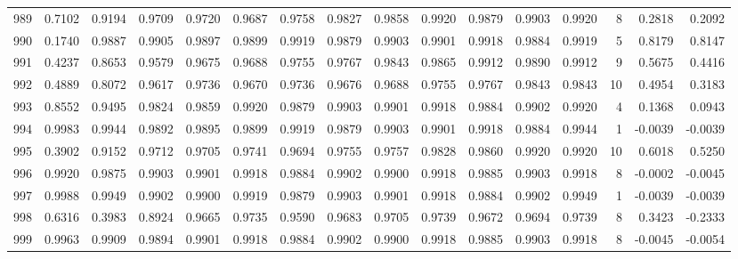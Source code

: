 \begin{tabular}{lrrrrrrrrrrrrrrr}
989 &      0.7102 &  0.9194 &  0.9709 &  0.9720 &  0.9687 &  0.9758 &  0.9827 &  0.9858 &  0.9920 &  0.9879 &   0.9903 &     0.9920 &      8 &                    0.2818 &                     0.2092 \\
990 &      0.1740 &  0.9887 &  0.9905 &  0.9897 &  0.9899 &  0.9919 &  0.9879 &  0.9903 &  0.9901 &  0.9918 &   0.9884 &     0.9919 &      5 &                    0.8179 &                     0.8147 \\
991 &      0.4237 &  0.8653 &  0.9579 &  0.9675 &  0.9688 &  0.9755 &  0.9767 &  0.9843 &  0.9865 &  0.9912 &   0.9890 &     0.9912 &      9 &                    0.5675 &                     0.4416 \\
992 &      0.4889 &  0.8072 &  0.9617 &  0.9736 &  0.9670 &  0.9736 &  0.9676 &  0.9688 &  0.9755 &  0.9767 &   0.9843 &     0.9843 &     10 &                    0.4954 &                     0.3183 \\
993 &      0.8552 &  0.9495 &  0.9824 &  0.9859 &  0.9920 &  0.9879 &  0.9903 &  0.9901 &  0.9918 &  0.9884 &   0.9902 &     0.9920 &      4 &                    0.1368 &                     0.0943 \\
994 &      0.9983 &  0.9944 &  0.9892 &  0.9895 &  0.9899 &  0.9919 &  0.9879 &  0.9903 &  0.9901 &  0.9918 &   0.9884 &     0.9944 &      1 &                   -0.0039 &                    -0.0039 \\
995 &      0.3902 &  0.9152 &  0.9712 &  0.9705 &  0.9741 &  0.9694 &  0.9755 &  0.9757 &  0.9828 &  0.9860 &   0.9920 &     0.9920 &     10 &                    0.6018 &                     0.5250 \\
996 &      0.9920 &  0.9875 &  0.9903 &  0.9901 &  0.9918 &  0.9884 &  0.9902 &  0.9900 &  0.9918 &  0.9885 &   0.9903 &     0.9918 &      8 &                   -0.0002 &                    -0.0045 \\
997 &      0.9988 &  0.9949 &  0.9902 &  0.9900 &  0.9919 &  0.9879 &  0.9903 &  0.9901 &  0.9918 &  0.9884 &   0.9902 &     0.9949 &      1 &                   -0.0039 &                    -0.0039 \\
998 &      0.6316 &  0.3983 &  0.8924 &  0.9665 &  0.9735 &  0.9590 &  0.9683 &  0.9705 &  0.9739 &  0.9672 &   0.9694 &     0.9739 &      8 &                    0.3423 &                    -0.2333 \\
999 &      0.9963 &  0.9909 &  0.9894 &  0.9901 &  0.9918 &  0.9884 &  0.9902 &  0.9900 &  0.9918 &  0.9885 &   0.9903 &     0.9918 &      8 &                   -0.0045 &                    -0.0054 \\
\bottomrule
\end{tabular}
